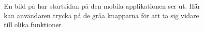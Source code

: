 \documentclass[a4paper,12pt]{article}
\begin{document}
 \begin{figure}[H]
   \centering
   \caption{En bild på hur startsidan på den mobila applikationen ser ut. Här kan användaren trycka på de gråa knapparna för att ta sig vidare till olika funktioner.}
   \label{fig:mob_main}
 \end{figure}
\end{document}
